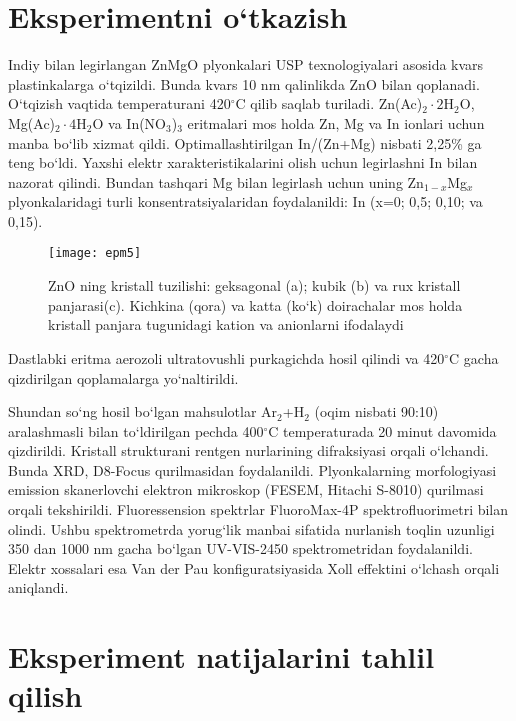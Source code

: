 \documentclass[14pt]{article}
\begin{document}
	 \section{Eksperimentni o`tkazish}
	Indiy bilan legirlangan ZnMgO plyonkalari USP texnologiyalari asosida kvars plastinkalarga o`tqizildi. Bunda kvars 10 nm qalinlikda ZnO bilan qoplanadi. O`tqizish vaqtida temperaturani 420$^{\circ}$C qilib saqlab turiladi. Zn(Ac)$_{2}\cdot 2$H$_{2}$O, Mg(Ac)$_{2}\cdot 4$H$_{2}$O va In(NO$_{3}$)$_{3}$ eritmalari mos holda Zn, Mg va In ionlari uchun manba bo`lib xizmat qildi. 
	Optimallashtirilgan In/(Zn+Mg) nisbati 2,25\% ga teng bo`ldi. Yaxshi elektr xarakteristikalarini olish uchun legirlashni In bilan nazorat qilindi. Bundan tashqari Mg bilan legirlash uchun uning Zn$_{1-x}$Mg$_{x}$ plyonkalaridagi turli konsentratsiyalaridan foydalanildi: In (x=0; 0,5; 0,10; va 0,15). 
	
	
\begin{figure*}[h]
	\centering
	\texttt{[image: epm5]}
	\caption{ZnO ning kristall tuzilishi: geksagonal (a); kubik (b) va rux kristall panjarasi(c). Kichkina (qora) va katta (ko`k) doirachalar mos holda kristall panjara tugunidagi kation va anionlarni ifodalaydi }
	\label{fig:epm5}
\end{figure*}
	
	
	Dastlabki eritma aerozoli ultratovushli purkagichda hosil qilindi va 420$^{\circ}$C gacha qizdirilgan qoplamalarga yo`naltirildi. 
	
	Shundan so`ng hosil bo`lgan mahsulotlar Ar$_{2}$+H$_{2}$ (oqim nisbati 90:10) aralashmasli bilan to`ldirilgan pechda 400$^{\circ}$C temperaturada 20 minut davomida qizdirildi. Kristall strukturani rentgen nurlarining difraksiyasi orqali o`lchandi. Bunda XRD, D8-Focus qurilmasidan foydalanildi. Plyonkalarning morfologiyasi emission skanerlovchi elektron mikroskop (FESEM, Hitachi S-8010) qurilmasi orqali tekshirildi. Fluoressension spektrlar FluoroMax-4P spektrofluorimetri bilan olindi. Ushbu spektrometrda yorug`lik manbai sifatida nurlanish toqlin uzunligi 350 dan 1000 nm gacha bo`lgan UV-VIS-2450 spektrometridan foydalanildi. Elektr xossalari esa Van der Pau konfiguratsiyasida Xoll effektini o`lchash orqali aniqlandi. 
	
	
	
	\section{Eksperiment natijalarini tahlil qilish}
	
\end{document}
